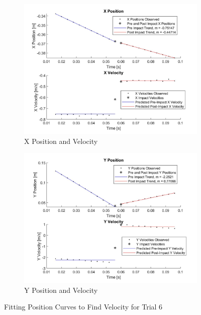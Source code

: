\documentclass{article}
\begin{document}
\begin{figure}[h!]
    \centering
     \begin{subfigure}[b]{0.45\linewidth}
            \centering
            \includegraphics[scale=0.125]{xTrial6.jpg}
            \caption{X Position and Velocity}
            \label{fig:xt6}
    \end{subfigure}
    \quad
    \begin{subfigure}[b]{0.45\linewidth}
            \centering
            \includegraphics[scale=0.125]{yTrial6.jpg}
            \caption{Y Position and Velocity}
            \label{fig:yt6}
    \end{subfigure}
    \caption{Fitting Position Curves to Find Velocity for Trial 6}
\end{figure}
\end{document}
